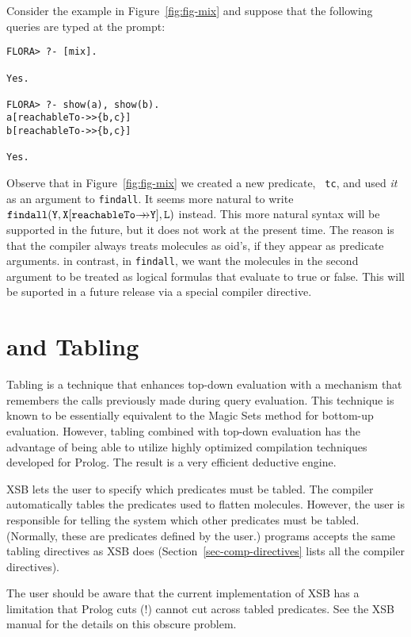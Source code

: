 \documentclass[11pt]{report}
\begin{document}
Consider the example in Figure~\ref{fig:fig-mix} and suppose that the
following queries are typed at the \FLORA prompt:
\begin{verbatim}
FLORA> ?- [mix].

Yes.

FLORA> ?- show(a), show(b).
a[reachableTo->>{b,c}]
b[reachableTo->>{b,c}]

Yes.
\end{verbatim}

Observe that in Figure~\ref{fig:fig-mix} we created a new predicate, {\tt
  tc}, and used \emph{it} as an argument to {\tt findall}. It seems more
natural to write $\mathtt{findall(Y,X[reachableTo{{\rightarrow\!\!\!\!\rightarrow}}Y],L)}$ instead.
This more natural syntax will be supported in the future, but it does not
work at the present time. The reason is that the \FLORA compiler always
treats \fl molecules as oid's, if they appear as predicate arguments. in
contrast, in {\tt findall}, we want the molecules in the second argument to
be treated as logical formulas that evaluate to true or false.  This will
be suported in a future release via a special compiler directive.

\section{\FLORA and Tabling}\label{sec-tabling-flora}

Tabling is a technique that enhances top-down evaluation with a mechanism
that remembers the calls previously made during query evaluation.
This technique is known to be essentially equivalent to the Magic Sets
method for bottom-up evaluation. However, tabling combined with top-down
evaluation has the advantage of being able to utilize highly optimized
compilation techniques developed for Prolog. The result is a very efficient
deductive engine.

XSB lets the user to specify which predicates must be tabled.  The \FLORA
compiler automatically tables the predicates used to flatten \fl molecules.
However, the user is responsible for telling the system which other
predicates must be tabled. (Normally, these are predicates defined by the
user.)  \FLORA programs accepts the same tabling directives as XSB does
(Section~\ref{sec-comp-directives} lists all the compiler directives).

The user should be aware that the current implementation of XSB has a
limitation that Prolog cuts (!) cannot cut across tabled predicates. See
the XSB manual for the details on this obscure problem.
\end{document}
